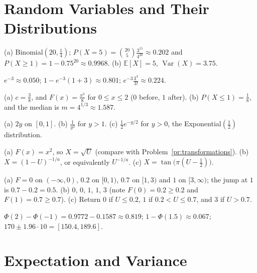 \documentclass[11pt]{article}
\newcommand{\E}{\mathbb{E}}
\DeclareMathOperator{\Var}{Var}
\begin{document}
\section*{Random Variables and Their Distributions}

\begin{description}[leftmargin=0pt, itemsep=0.3em]
    \item[\ref{pr:guessing}.] (a) Binomial$(20, \frac{1}{4})$; $P(X = 5) = \binom{20}{5}\frac{3^{15}}{4^{20}} \approx 0.202$ and $P(X \geq 1) = 1 - 0.75^{20} \approx 0.9968$. (b) $\E[X] = 5$, $\Var(X) = 3.75$.
    \item[\ref{pr:poisson}.] $e^{-3} \approx 0.050$; $1 - e^{-3}(1 + 3) \approx 0.801$; $e^{-3}\frac{3^3}{3!} \approx 0.224$.
    \item[\ref{pr:density}.] (a) $c = \frac{3}{8}$, and $F(x) = \frac{x^3}{8}$ for $0 \leq x \leq 2$ ($0$ before, $1$ after). (b) $P(X \leq 1) = \frac{1}{8}$, and the median is $m = 4^{1/3} \approx 1.587$.
    \item[\ref{pr:transformations}.] (a) $2y$ on $[0, 1]$. (b) $\frac{1}{y^2}$ for $y > 1$. (c) $\frac{1}{2}e^{-y/2}$ for $y > 0$, the Exponential$(\frac{1}{2})$ distribution.
    \item[\ref{pr:inverse-transform}.] (a) $F(x) = x^2$, so $X = \sqrt{U}$ (compare with Problem~\ref{pr:transformations}). (b) $X = (1 - U)^{-1/a}$, or equivalently $U^{-1/a}$. (c) $X = \tan\big(\pi(U - \frac{1}{2})\big)$.
    \item[\ref{pr:quantile}.] (a) $F = 0$ on $(-\infty, 0)$, $0.2$ on $[0, 1)$, $0.7$ on $[1, 3)$ and $1$ on $[3, \infty)$; the jump at $1$ is $0.7 - 0.2 = 0.5$. (b) $0$, $0$, $1$, $1$, $3$ (note $F(0) = 0.2 \geq 0.2$ and $F(1) = 0.7 \geq 0.7$). (c) Return $0$ if $U \leq 0.2$, $1$ if $0.2 < U \leq 0.7$, and $3$ if $U > 0.7$.
    \item[\ref{pr:heights}.] $\Phi(2) - \Phi(-1) = 0.9772 - 0.1587 \approx 0.819$; $1 - \Phi(1.5) \approx 0.067$; $170 \pm 1.96 \cdot 10 = [150.4, 189.6]$.
\end{description}

\section*{Expectation and Variance}
\end{document}

